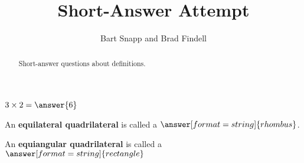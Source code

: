 \documentclass[nooutcomes]{ximera}
\title{Short-Answer Attempt}
\author{Bart Snapp and Brad Findell}
\begin{document}
\begin{abstract}
Short-answer questions about definitions. 
\end{abstract}
\maketitle

%

\begin{question}  
$3\times 2 = \answer{6}$  
\end{question}


\begin{question}  
An \textbf{equilateral quadrilateral} is called a $\answer[format=string]{rhombus}$.
\end{question}


\begin{question}  
An \textbf{equiangular quadrilateral} is called a $\answer[format=string]{rectangle}$
\end{question}


\end{document}
